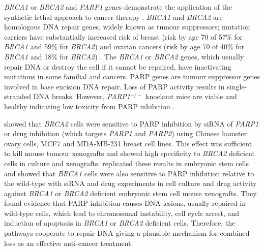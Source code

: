 \textit{BRCA1} or \textit{BRCA2} and \textit{PARP1} genes demonstrate the application of the \gls{synthetic lethal} approach to cancer therapy \citep{Ashworth2008, Kaelin2005}. \textit{BRCA1} and \textit{BRCA2} are homologous \acrshort{DNA} repair genes, widely known as \glspl{tumour suppressor}; \gls{mutation} carriers have substantially increased risk of breast (risk by age 70 of 57\% for \textit{BRCA1} and 59\% for \textit{BRCA2}) and ovarian cancers (risk by age 70 of 40\% for \textit{BRCA1} and 18\% for \textit{BRCA2}) \citep{Chen2007}. The \textit{BRCA1} or \textit{BRCA2} genes, which usually repair \acrshort{DNA} or destroy the cell if it cannot be repaired, have inactivating  \glspl{mutation} in some \gls{familial} and  cancers. \acrfull{PARP} genes are \gls{tumour suppressor} genes involved in base excision \acrshort{DNA} repair. Loss of \gls{PARP} activity results in single-stranded \acrshort{DNA} breaks. However, \textit{PARP1}$^{-/-}$ knockout mice are viable and healthy indicating low toxicity from \gls{PARP} inhibition \citep{Bryant2005}.  

\citet{Bryant2005} showed that \textit{BRCA2} cells were sensitive to \gls{PARP} inhibition by \gls{siRNA} of \textit{PARP1} or drug inhibition (which targets \textit{PARP1} and \textit{PARP2}) using Chinese hamster ovary cells, MCF7 and MDA-MB-231 breast cell lines. This effect was sufficient to kill mouse tumour xenografts and showed high specificity to \textit{BRCA2} deficient cells in culture and xenografts. \citet{Farmer2005} replicated these results in embryonic stem cells and showed that \textit{BRCA1} cells were also sensitive to \gls{PARP} inhibition relative to the \gls{wild-type} with \gls{siRNA} and drug experiments in cell culture and drug activity against \textit{BRCA1} or \textit{BRCA2} deficient embryonic stem cell mouse xenografts. They found evidence that \gls{PARP} inhibition causes \acrshort{DNA} lesions, usually repaired in \gls{wild-type} cells, which lead to chromosomal instability, cell cycle arrest, and induction of apoptosis in \textit{BRCA1} or \textit{BRCA2} deficient cells. Therefore, the \glspl{pathway} cooperate to repair \acrshort{DNA} giving a plausible mechanism for combined loss as an effective anti-cancer treatment.  

